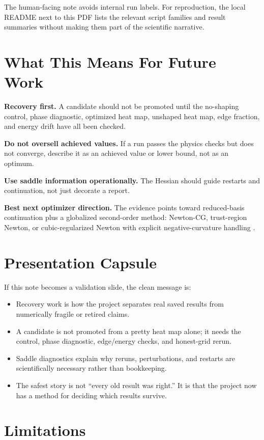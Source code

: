 \documentclass[11pt]{article}
\begin{document}
The human-facing note avoids internal run labels. For reproduction, the local
README next to this PDF lists the relevant script families and result
summaries without making them part of the scientific narrative.

\section{What This Means For Future Work}

\textbf{Recovery first.} A candidate should not be promoted until the no-shaping
control, phase diagnostic, optimized heat map, unshaped heat map, edge
fraction, and energy drift have all been checked.

\textbf{Do not oversell achieved values.} If a run passes the physics checks
but does not converge, describe it as an achieved value or lower bound, not as
an optimum.

\textbf{Use saddle information operationally.} The Hessian should guide
restarts and continuation, not just decorate a report.

\textbf{Best next optimizer direction.} The evidence points toward
reduced-basis continuation plus a globalized second-order method: Newton-CG,
trust-region Newton, or cubic-regularized Newton with explicit
negative-curvature handling \cite{conn2000,nesterov2006,nocedal2006}.

\section{Presentation Capsule}

If this note becomes a validation slide, the clean message is:
\begin{itemize}
    \item Recovery work is how the project separates real saved results from numerically fragile or retired claims.
    \item A candidate is not promoted from a pretty heat map alone; it needs the control, phase diagnostic, edge/energy checks, and honest-grid rerun.
    \item Saddle diagnostics explain why reruns, perturbations, and restarts are scientifically necessary rather than bookkeeping.
    \item The safest story is not ``every old result was right.'' It is that the project now has a method for deciding which results survive.
\end{itemize}

\section{Limitations}
\end{document}
